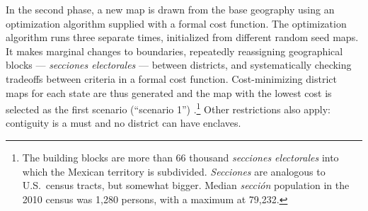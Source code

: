 \documentclass[letter,12pt]{article}
\begin{document}
In the second phase, a new map is drawn from the base geography using an optimization algorithm supplied with a formal cost function. The optimization algorithm runs three separate times, initialized from different random seed maps. It makes marginal changes to boundaries, repeatedly reassigning geographical blocks --- \emph{secciones electorales} --- between districts, and systematically checking tradeoffs between criteria in a formal cost function. Cost-minimizing district maps for each state are thus generated and the map with the lowest cost is selected as the first scenario (``scenario 1'') \citep{trelles.mtz.tesisItam.2007}.\footnote{The building blocks are more than 66 thousand \emph{secciones electorales} into which the Mexican territory is subdivided. \emph{Secciones} are analogous to U.S.\ census tracts, but somewhat bigger. Median \emph{secci\'on} population in the 2010 census was 1,280 persons, with a maximum at 79,232.} Other restrictions also apply: contiguity is a must and no district can have enclaves.  
\end{document}
